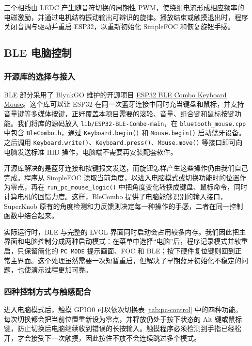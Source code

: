 三个相线由 LEDC 产生随音符切换的周期性 PWM，使绕组电流形成相应频率的电磁激励，并通过电机结构振动输出可辨识的旋律。播放结束或触摸退出时，程序关闭音调与驱动并重启 ESP32，以重新初始化 SimpleFOC 和恢复旋钮手感。

\subsection{BLE 电脑控制}

\subsubsection{开源库的选择与接入}

BLE 部分采用了 BlynkGO 维护的开源项目 \href{https://github.com/BlynkGO/ESP32-BLE-Combo}{ESP32 BLE Combo Keyboard Mouse}。这个库可以让 ESP32 在同一次蓝牙连接中同时充当键盘和鼠标，并支持音量键等多媒体按键，正好覆盖本项目需要的滚轮、音量、组合键和鼠标按键功能。我们将库的源码放入 \texttt{lib/ESP32-BLE-Combo-main}，在 \texttt{bluetooth\_mouse.cpp} 中包含 \texttt{BleCombo.h}，通过 \texttt{Keyboard.begin()} 和 \texttt{Mouse.begin()} 启动蓝牙设备。之后调用 \texttt{Keyboard.write()}、\texttt{Keyboard.press()}、\texttt{Mouse.move()} 等接口即可向电脑发送标准 HID 操作，电脑端不需要再安装配套软件。

开源库解决的是蓝牙连接和按键报文发送，而旋钮怎样产生这些操作仍由我们自己完成。程序从 SimpleFOC 读取当前角度，以进入电脑模式或切换功能时的位置作为零点，再在 \texttt{run\_pc\_mouse\_logic()} 中把角度变化转换成键盘、鼠标命令，同时计算电机的回馈力度。这样，BleCombo 提供了电脑能够识别的输入接口，SuperKnob 原有的角度检测和力反馈则决定每一种操作的手感，二者在同一控制函数中结合起来。

实际运行时，BLE 与完整的 LVGL 界面同时启动会占用较多内存。我们因此把主界面和电脑控制分成两种启动模式：在菜单中选择“电脑”后，程序记录模式并软重启，只保留简化的 \texttt{PC MODE} 提示画面、FOC 和 BLE；按下硬件复位键则回到正常主界面。这个处理虽然需要一次短暂重启，但解决了早期蓝牙初始化不稳定的问题，也使演示过程更加可靠。

\subsubsection{四种控制方式与触感配合}

进入电脑模式后，触摸 GPIO0 可以依次切换表 \ref{tab:pc-control} 中的四种功能。每次切换都会把当前位置重新设为零点，并释放仍处于按下状态的 Alt 键或鼠标键，防止切换后电脑继续收到错误的长按输入。触摸程序必须检测到手指已经松开，才会接受下一次触摸，因此按住不放不会连续跳过多个模式。

